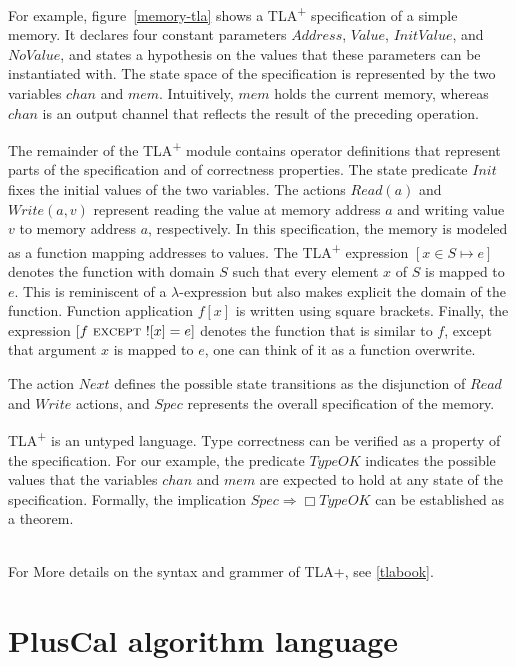 \documentclass{thesul}
\newcommand{\tlaplus}{TLA\textsuperscript{+}\xspace}
\newcommand{\EXCEPT}{\textsc{except}}
\begin{document}
For example, figure~\ref{memory-tla} shows a \tlaplus specification of a simple memory. It declares four constant parameters $Address$, $Value$, $InitValue$, and $NoValue$, and states a hypothesis on the values that these parameters can be instantiated with. The state space of the specification is represented by the two variables $chan$ and $mem$. Intuitively, $mem$ holds the current memory, whereas $chan$ is an output channel that reflects the result of the preceding operation.

The remainder of the \tlaplus module contains operator definitions that represent parts of the specification and of correctness properties. The state predicate $Init$ fixes the initial values of the two variables. The actions $Read(a)$ and $Write(a,v)$ represent reading the value at memory address $a$ and writing value $v$ to memory address $a$, respectively. In this specification, the memory is modeled as a function mapping addresses to values. The \tlaplus expression $[x \in S \mapsto e]$ denotes the function with domain $S$ such that every element $x$ of $S$ is mapped to $e$. This is reminiscent of a $\lambda$-expression but also makes explicit the domain of the function. Function application $f[x]$ is written using square brackets. Finally, the expression $[f\ \EXCEPT\ ![x] = e]$ denotes the function that is similar to $f$, except that argument $x$ is mapped to $e$, one can think of it as a function overwrite.

The action $Next$ defines the possible state transitions as the disjunction of $Read$ and $Write$ actions, and $Spec$ represents the overall specification of the memory.

\tlaplus is an untyped language. Type correctness can be verified as a property of the specification. For our example, the predicate $TypeOK$ indicates the possible values that the variables $chan$ and $mem$ are expected to hold at any state of the specification. Formally, the implication $Spec \Rightarrow \Box TypeOK$ can be established as a theorem.

\bigskip

\hfill\\

For More details on the syntax and grammer of TLA+, see \ref{tlabook}.

\section{PlusCal algorithm language}
\end{document}
